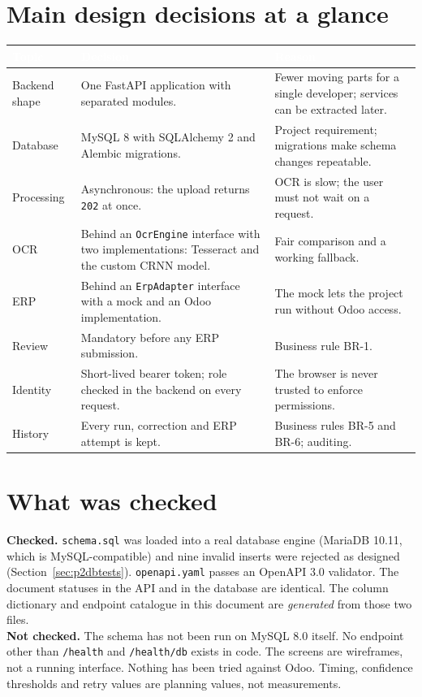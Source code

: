 \documentclass[11pt,a4paper]{report}
\newcommand{\hdr}[1]{\textcolor{white}{\sffamily\bfseries #1}}
\newcommand{\tblstart}{\rowcolors{2}{white}{rowgray}\arrayrulecolor{teal!60}}
\newcommand{\hdrrow}{\rowcolor{navy}}
\begin{document}
\section{Main design decisions at a glance}
{\tblstart\small
\begin{longtable}{L{3.6cm}L{4.6cm}L{5.6cm}}
\hdrrow \hdr{Topic} & \hdr{Decision} & \hdr{Reason}\\ \endhead
Backend shape & One FastAPI application with separated modules. & Fewer moving parts for a single developer; services can be extracted later.\\
Database & MySQL 8 with SQLAlchemy 2 and Alembic migrations. & Project requirement; migrations make schema changes repeatable.\\
Processing & Asynchronous: the upload returns \texttt{202} at once. & OCR is slow; the user must not wait on a request.\\
OCR & Behind an \texttt{OcrEngine} interface with two implementations: Tesseract and the custom CRNN model. & Fair comparison and a working fallback.\\
ERP & Behind an \texttt{ErpAdapter} interface with a mock and an Odoo implementation. & The mock lets the project run without Odoo access.\\
Review & Mandatory before any ERP submission. & Business rule BR-1.\\
Identity & Short-lived bearer token; role checked in the backend on every request. & The browser is never trusted to enforce permissions.\\
History & Every run, correction and ERP attempt is kept. & Business rules BR-5 and BR-6; auditing.\\
\hline
\end{longtable}}

\section{What was checked}\label{sec:p2verified}
\begin{statusbox}
\textbf{Checked.} \texttt{schema.sql} was loaded into a real database engine (MariaDB 10.11, which is MySQL-compatible) and nine invalid inserts were rejected as designed (Section~\ref{sec:p2dbtests}). \texttt{openapi.yaml} passes an OpenAPI 3.0 validator. The document statuses in the API and in the database are identical. The column dictionary and endpoint catalogue in this document are \emph{generated} from those two files.\\[3pt]
\textbf{Not checked.} The schema has not been run on MySQL 8.0 itself. No endpoint other than \texttt{/health} and \texttt{/health/db} exists in code. The screens are wireframes, not a running interface. Nothing has been tried against Odoo. Timing, confidence thresholds and retry values are planning values, not measurements.
\end{statusbox}
\end{document}
